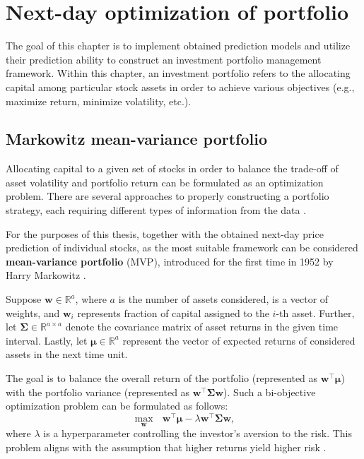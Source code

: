 \chapter{Next-day optimization of portfolio}
\label{chap:4}
The goal of this chapter is to implement obtained prediction models and utilize their prediction ability
to construct an investment portfolio management framework. Within this chapter, an investment portfolio refers
to the allocating capital among particular stock assets in order to achieve various objectives (e.g., maximize return, minimize volatility, etc.).

\section{Markowitz mean-variance portfolio}

Allocating capital to a given set of stocks in order to balance the trade-off of asset volatility 
and portfolio return can be formulated as an optimization problem. There are several approaches
to properly constructing a portfolio strategy, each requiring different types of information from the data \cite{portfolio}.

For the purposes of this thesis, together with the obtained next-day price prediction of individual stocks, as
the most suitable framework can be considered \textbf{mean-variance portfolio} (MVP), introduced for the 
first time in 1952 by Harry Markowitz \cite{portfolio}.

Suppose $\mathbf{w} \in \mathbb{R}^a$, where $a$ is the number of assets considered, is a vector of weights, and $\mathbf{w}_i$ represents
fraction of capital assigned to the $i$-th asset. Further, let $\bm{\Sigma} \in \mathbb{R}^{a \times a}$ denote the covariance matrix of asset returns
in the given time interval. Lastly, let $\bm{\mu} \in \mathbb{R}^{a}$ represent the vector of expected returns of considered assets in the next time unit.

The goal is to balance the overall return of the portfolio (represented as $\mathbf{w}^{\top}\bm{\mu}$) with the portfolio variance (represented as $\mathbf{w}^{\top}\bm{\Sigma}\mathbf{w}$). Such 
a bi-objective optimization problem can be formulated as follows:
\begin{equation}
    \label{eq:4.1}
    \max_{\mathbf{w}} \>\>\> \mathbf{w}^{\top}\bm{\mu} - \lambda \mathbf{w}^{\top}\bm{\Sigma}\mathbf{w},
\end{equation}
where $\lambda$ is a hyperparameter controlling the investor's aversion to the risk. This problem aligns with the assumption that higher returns yield higher risk \cite{portfolio}.


